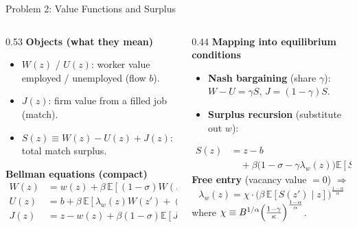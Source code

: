 \documentclass[aspectratio=169,11pt]{beamer}
\newcommand{\E}{\mathbb{E}}
\begin{document}
\begin{frame}{Problem 2: Value Functions and Surplus}
    \footnotesize
    \vspace{-0.5em}
    \begin{columns}[T]
        \begin{column}{0.53\textwidth}
            \textbf{Objects (what they mean)}
            \begin{itemize}\setlength\itemsep{0.15em}
                \item $W(z)$ / $U(z)$: worker value employed / unemployed (flow $b$).
                \item $J(z)$: firm value from a filled job (match).
                \item $S(z)\equiv W(z)-U(z)+J(z)$: total match surplus.
            \end{itemize}
            \vspace{0.15em}

            \textbf{Bellman equations (compact)}
            \[
            \begin{aligned}
            W(z)&= w(z)+\beta\,\E[(1-\sigma)W(z')+\sigma U(z')],\\
            U(z)&= b+\beta\,\E[\lambda_w(z)W(z')+(1-\lambda_w(z))U(z')],\\
            J(z)&= z-w(z)+\beta(1-\sigma)\E[J(z')].
            \end{aligned}
            \]
        \end{column}
        \begin{column}{0.44\textwidth}
            \textbf{Mapping into equilibrium conditions}
            \begin{itemize}\setlength\itemsep{0.15em}
                \item \textbf{Nash bargaining} (share $\gamma$):\ $W-U=\gamma S$, $J=(1-\gamma)S$.
                \item \textbf{Surplus recursion} (substitute out $w$):
            \end{itemize}
            \[
            \boxed{\begin{aligned}
            S(z) &= z-b \\
            &\quad + \beta\bigl(1-\sigma-\gamma\lambda_w(z)\bigr)\E[S(z')\mid z]
            \end{aligned}}
            \]
            \vspace{0.1em}
            \textbf{Free entry} (vacancy value $=0$) $\Rightarrow$
            \[
            \boxed{\lambda_w(z)=\chi\cdot\bigl(\beta\,\E[S(z')\mid z]\bigr)^{\frac{1-\alpha}{\alpha}}}
            \]
            {\scriptsize where $\chi \equiv B^{1/\alpha}\Bigl(\frac{1-\gamma}{\kappa}\Bigr)^{\frac{1-\alpha}{\alpha}}$.}
        \end{column}
    \end{columns}
\end{frame}
\end{document}
